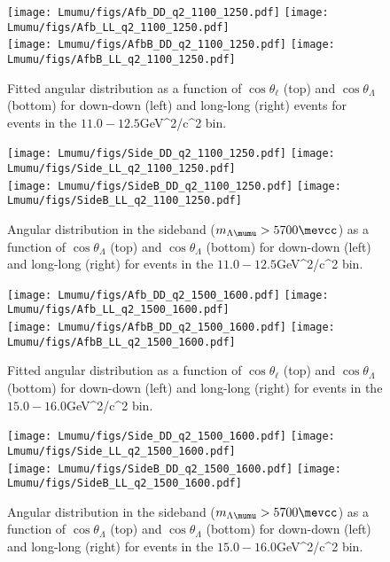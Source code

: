 
\begin{figure}[!htb]
\centering
\texttt{[image: Lmumu/figs/Afb\_DD\_q2\_1100\_1250.pdf]}
\texttt{[image: Lmumu/figs/Afb\_LL\_q2\_1100\_1250.pdf]} \\
\texttt{[image: Lmumu/figs/AfbB\_DD\_q2\_1100\_1250.pdf]}
\texttt{[image: Lmumu/figs/AfbB\_LL\_q2\_1100\_1250.pdf]}
\caption{Fitted angular distribution as a function of $\cos\theta_\ell$ (top) and $\cos\theta_\Lambda$ (bottom) for down-down (left) and long-long (right) events for events in the $11.0-12.5$GeV^2/c^2$$ \qsq bin.  }
\end{figure}




\begin{figure}[!htb]
\centering
\texttt{[image: Lmumu/figs/Side\_DD\_q2\_1100\_1250.pdf]}
\texttt{[image: Lmumu/figs/Side\_LL\_q2\_1100\_1250.pdf]} \\
\texttt{[image: Lmumu/figs/SideB\_DD\_q2\_1100\_1250.pdf]}
\texttt{[image: Lmumu/figs/SideB\_LL\_q2\_1100\_1250.pdf]}
\caption{Angular distribution in the sideband ($m_{\Lambda\mumu} > 5700 \mevcc$) as a function of $\cos\theta_\Lambda$ (top) and $\cos\theta_\Lambda$ (bottom) for down-down (left) and long-long (right) for events in the $11.0-12.5$GeV^2/c^2$$ \qsq bin.  }
\end{figure}




\begin{figure}[!htb]
\centering
\texttt{[image: Lmumu/figs/Afb\_DD\_q2\_1500\_1600.pdf]}
\texttt{[image: Lmumu/figs/Afb\_LL\_q2\_1500\_1600.pdf]} \\
\texttt{[image: Lmumu/figs/AfbB\_DD\_q2\_1500\_1600.pdf]}
\texttt{[image: Lmumu/figs/AfbB\_LL\_q2\_1500\_1600.pdf]}
\caption{Fitted angular distribution as a function of $\cos\theta_\ell$ (top) and $\cos\theta_\Lambda$ (bottom) for down-down (left) and long-long (right) for events in the $15.0-16.0$GeV^2/c^2$$ \qsq bin.  }
\end{figure}



\begin{figure}[!htb]
\centering
\texttt{[image: Lmumu/figs/Side\_DD\_q2\_1500\_1600.pdf]}
\texttt{[image: Lmumu/figs/Side\_LL\_q2\_1500\_1600.pdf]} \\
\texttt{[image: Lmumu/figs/SideB\_DD\_q2\_1500\_1600.pdf]}
\texttt{[image: Lmumu/figs/SideB\_LL\_q2\_1500\_1600.pdf]}
\caption{Angular distribution in the sideband ($m_{\Lambda\mumu} > 5700 \mevcc$) as a function of $\cos\theta_\Lambda$ (top) and $\cos\theta_\Lambda$ (bottom) for down-down (left) and long-long (right) for events in the $15.0-16.0$GeV^2/c^2$$ \qsq bin.  }
\end{figure}


